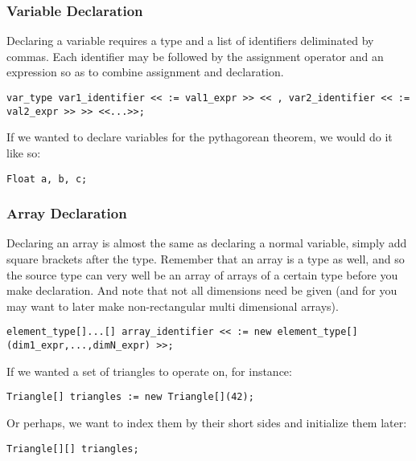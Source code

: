 \subsubsection{Variable Declaration}
Declaring a variable requires a type and a list of identifiers deliminated by commas. Each identifier may be followed by the assignment operator and an expression so as to combine assignment and declaration.

\begin{lstlisting}
var_type var1_identifier << := val1_expr >> << , var2_identifier << := val2_expr >> >> <<...>>;
\end{lstlisting}

If we wanted to declare variables for the pythagorean theorem, we would do it like so:

\begin{lstlisting}[caption=Variable Initialization for the Pythagorean Theorem,backgroundcolor=\color{tintedorange}]
Float a, b, c;
\end{lstlisting}

\subsubsection{Array Declaration}
Declaring an array is almost the same as declaring a normal variable, simply add square brackets after the type. Remember that an array is a type as well, and so the source type can very well be an array of arrays of a certain type before you make declaration. And note that not all dimensions need be given (and for you may want to later make non-rectangular multi dimensional arrays).

\begin{lstlisting}
element_type[]...[] array_identifier << := new element_type[](dim1_expr,...,dimN_expr) >>;
\end{lstlisting}

If we wanted a set of triangles to operate on, for instance:

\begin{lstlisting}[caption=Array Declaration and Instantiation of Many Triangles, backgroundcolor=\color{tintedorange}]
Triangle[] triangles := new Triangle[](42);
\end{lstlisting}

Or perhaps, we want to index them by their short sides and initialize them later:

\begin{lstlisting}[caption=Array Declaration of a 2-Degree Triangle Array,backgroundcolor=\color{tintedorange}]
Triangle[][] triangles;
\end{lstlisting}

